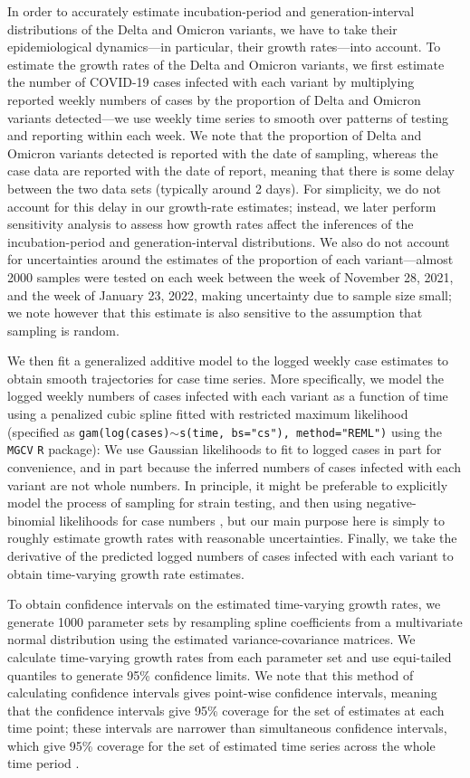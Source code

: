 \documentclass[12pt]{article}
\begin{document}
In order to accurately estimate incubation-period and generation-interval distributions of the Delta and Omicron variants, we have to take their epidemiological dynamics---in particular, their growth rates---into account.
To estimate the growth rates of the Delta and Omicron variants, we first estimate the number of COVID-19 cases infected with each variant by multiplying reported weekly numbers of cases by the proportion of Delta and Omicron variants detected---we use weekly time series to smooth over patterns of testing and reporting within each week. 
We note that the proportion of Delta and Omicron variants detected is reported with the date of sampling, whereas the case data are reported with the date of report, meaning that there is some delay between the two data sets (typically around 2 days).
For simplicity, we do not account for this delay in our growth-rate estimates; 
instead, we later perform sensitivity analysis to assess how growth rates affect the inferences of the incubation-period and generation-interval distributions.
We also do not account for uncertainties around the estimates of the proportion of each variant---almost 2000 samples were tested on each week between the week of November 28, 2021, and the week of January 23, 2022, making uncertainty due to sample size small;
we note however that this estimate is also sensitive to  the assumption that sampling is random.

We then fit a generalized additive model \citep{wood2001mgcv} to the logged weekly case estimates to obtain smooth trajectories for case time series.
More specifically, we model the logged weekly numbers of cases infected with each variant as a function of time using a penalized cubic spline fitted with restricted maximum likelihood (specified as \texttt{gam(log(cases)$\sim$s(time, bs="cs"), method="REML")} using the \texttt{MGCV} \texttt{R} package):
We use Gaussian likelihoods to fit to logged cases in part for convenience, and in part because the inferred numbers of cases infected with each variant are not whole numbers.
In principle, it might be preferable to explicitly model the process of sampling for strain testing, and then using negative-binomial likelihoods for case numbers \citep{ver2007quasi}, but our main purpose here is simply to roughly estimate growth rates with reasonable uncertainties.
Finally, we take the derivative of the predicted logged numbers of cases infected with each variant to obtain time-varying growth rate estimates.

To obtain confidence intervals on the estimated time-varying growth rates, we generate 1000 parameter sets by resampling spline coefficients from a multivariate normal distribution using the estimated variance-covariance matrices.
We calculate time-varying growth rates from each parameter set and use equi-tailed quantiles to generate 95\% confidence limits. 
We note that this method of calculating confidence intervals gives point-wise confidence intervals, meaning that the confidence intervals give 95\% coverage for the set of estimates at each time point;
these intervals are narrower than simultaneous confidence intervals, which give 95\% coverage for the set of estimated time series across the whole time period \citep{simpson2017}.
\end{document}
